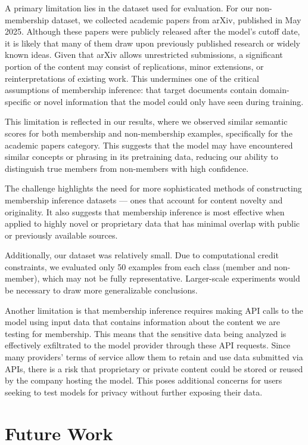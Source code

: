 \documentclass[sigconf]{acmart}
\begin{document}
A primary limitation lies in the dataset used for evaluation. For our non-membership dataset, we collected academic papers from arXiv, published in May 2025. Although these papers were publicly released after the model’s cutoff date, it is likely that many of them draw upon previously published research or widely known ideas. Given that arXiv allows unrestricted submissions, a significant portion of the content may consist of replications, minor extensions, or reinterpretations of existing work. This undermines one of the critical assumptions of membership inference: that target documents contain domain-specific or novel information that the model could only have seen during training.

This limitation is reflected in our results, where we observed similar semantic scores for both membership and non-membership examples, specifically for the academic papers category. This suggests that the model may have encountered similar concepts or phrasing in its pretraining data, reducing our ability to distinguish true members from non-members with high confidence.

The challenge highlights the need for more sophisticated methods of constructing membership inference datasets --- ones that account for content novelty and originality. It also suggests that membership inference is most effective when applied to highly novel or proprietary data that has minimal overlap with public or previously available sources.

Additionally, our dataset was relatively small. Due to computational credit constraints, we evaluated only 50 examples from each class (member and non-member), which may not be fully representative. Larger-scale experiments would be necessary to draw more generalizable conclusions.

Another limitation is that membership inference requires making API calls to the model using input data that contains information about the content we are testing for membership. This means that the sensitive data being analyzed is effectively exfiltrated to the model provider through these API requests. Since many providers’ terms of service allow them to retain and use data submitted via APIs, there is a risk that proprietary or private content could be stored or reused by the company hosting the model. This poses additional concerns for users seeking to test models for privacy without further exposing their data.

\section{Future Work}
\end{document}
